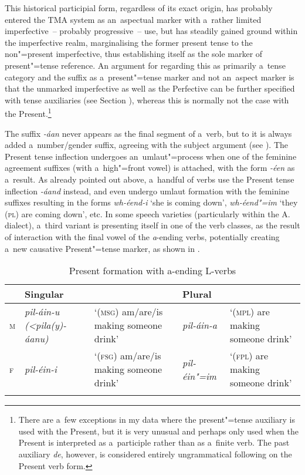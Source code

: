 This historical participial form, regardless of its exact origin, has probably entered the TMA system as an~aspectual marker with a~rather limited imperfective~-- probably progressive~-- use, but has steadily gained ground within the imperfective realm, marginalising the former present tense to the non"=present imperfective, thus establishing itself as the sole marker of present"=tense reference. An argument for regarding this as primarily a~tense category and the suffix as a~present"=tense marker and not an~aspect marker is that the unmarked imperfective as well as the Perfective can be further specified with tense auxiliaries (see Section ), whereas this is normally not the case with the Present.\footnote{There are a~few exceptions in my data where the present"=tense auxiliary is used with the Present, but it is very unusual and perhaps only used when the Present is interpreted as a~participle rather than as a~finite verb. The past auxiliary \textit{de}, however, is considered entirely ungrammatical following on the Present verb form.} 


The suffix \textit{-áan} never appears as the final segment of a~verb, but to it is always added a~number/gender suffix, agreeing with the subject argument (see ). The Present tense inflection undergoes an~umlaut"=process when one of the feminine agreement suffixes (with a~high"=front vowel) is attached, with the form \textit{-éen} as a~result. As already pointed out above, a~handful of verbs use the Present tense inflection \textit{-áand} instead, and even undergo umlaut formation with the feminine suffixes resulting in the forms \textit{wh-éend-i} `she is coming down', \textit{wh-éend"=im} `they (\textsc{pl}) are coming down', etc. In some speech varieties (particularly within the A. dialect), a~third variant is presenting itself in one of the verb classes, as the result of interaction with the final vowel of the \textit{a}-ending verbs, potentially creating a~new causative Present"=tense marker, as shown in .


\begin{table}[ht]
\caption{Present formation with a-ending L-verbs}
\begin{tabularx}{\textwidth}{ l P{25mm} Q l Q }
\lsptoprule
&
Singular &
&
Plural &
\\\hline
\textsc{m}
&
\textit{pil-áin-u }
\textit{({\textless}pila(y)-áanu)} &
`(\textsc{msg}) am/are/is making someone drink' &
\textit{pil-áin-a}
&
`(\textsc{mpl}) are making someone drink'\\
\textsc{f}
&
\textit{pil-éin-i} &
`(\textsc{fsg}) am/are/is making someone drink' &
\textit{pil-éin"=im} &
`(\textsc{fpl}) are making someone drink'\\\lspbottomrule
\end{tabularx}
\label{tab:8-25}
\end{table}


